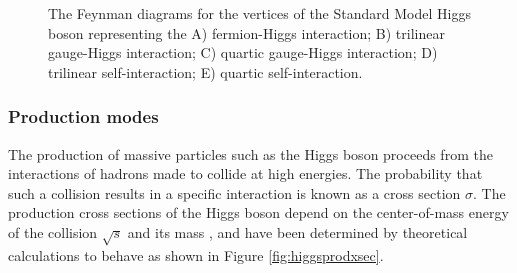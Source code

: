 \begin{figure}[htbp]
{     \qquad
  }
  \caption[Higgs Boson Interaction Vertices]{The Feynman diagrams for the vertices of the Standard Model Higgs boson representing the A) fermion-Higgs interaction; B) trilinear gauge-Higgs interaction; C) quartic gauge-Higgs interaction; D) trilinear self-interaction; E) quartic self-interaction.}
  \label{fig:higgsvertices}
\end{figure}
 
\subsubsection{Production modes}

The production of massive particles such as the Higgs boson proceeds from the interactions of hadrons made to collide at high energies. The probability that such a collision results in a specific interaction is known as a cross section $\sigma$. The production cross sections of the Higgs boson depend on the center-of-mass energy of the collision $\sqrt{s}$ and its mass \massH, and have been determined by theoretical calculations to behave as shown in Figure \ref{fig:higgsprodxsec}.

